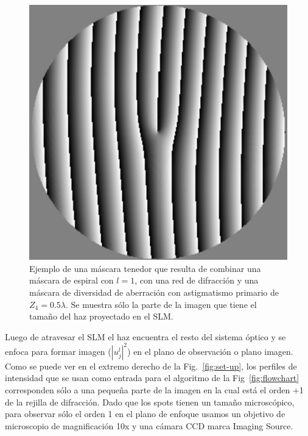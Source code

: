 \begin{figure}[h!]
\centering
\includegraphics[scale=.5]{mixed_mask_compact.pdf}
\caption[Ejemplo de una máscara tenedor con astigmatismo.]{Ejemplo de una máscara tenedor que resulta de combinar una
  máscara de espiral con $l=1$, con una red de difracción y una
  máscara de diversidad de aberración con astigmatismo primario de
  $Z_4=0.5\lambda$. Se muestra sólo la parte de la imagen que tiene el
tamaño del haz proyectado en el SLM.} 
\label{fig:mixed_mask}
\end{figure}

Luego de atravesar el SLM el haz encuentra el resto del sistema óptico
y se enfoca para formar imagen ($|u_j^l|^2$) en el plano de observación o plano
imagen. 
Como se puede ver en el extremo derecho de la Fig.~\ref{fig:set-up},
los perfiles de intensidad que se usan como entrada para el algoritmo
de la Fig~\ref{fig:flowchart} corresponden sólo a una pequeña parte
de la imagen en la cual está el orden +1 de la rejilla de
difracción. Dado que los spots tienen un tamaño microscópico, para observar sólo
el orden 1 en el plano de enfoque usamos un objetivo de 
microscopio de magnificación 10x y una cámara \acrshort{CCD} marca Imaging
Source.    

